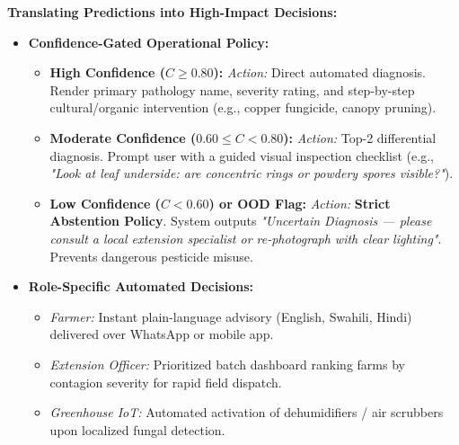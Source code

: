 \documentclass[8pt]{article}
\begin{document}
\vspace{2mm}%

\noindent%
\begin{minipage}[t]{0.327\linewidth}%
  \begin{tcolorbox}[
    canvasbox,
    colback=bgDecision,
    colframe=headDecision,
    title={7. DECISIONS \& OPERATIONAL ACTIONS},
    boxed title style={colback=headDecision},
    height=68mm
  ]
  \fontsize{7.2pt}{8.8pt}\selectfont
  \textbf{Translating Predictions into High-Impact Decisions:}
  \vspace{1mm}
  \begin{itemize}
    \item \textbf{Confidence-Gated Operational Policy:}
      \begin{itemize}
        \item \textbf{High Confidence ($C \ge 0.80$):}
          \emph{Action:} Direct automated diagnosis. Render primary pathology name, severity rating, and step-by-step cultural/organic intervention (e.g., copper fungicide, canopy pruning).
        \item \textbf{Moderate Confidence ($0.60 \le C < 0.80$):}
          \emph{Action:} Top-2 differential diagnosis. Prompt user with a guided visual inspection checklist (e.g., \emph{"Look at leaf underside: are concentric rings or powdery spores visible?"}).
        \item \textbf{Low Confidence ($C < 0.60$) or OOD Flag:}
          \emph{Action:} \textbf{Strict Abstention Policy}. System outputs \emph{"Uncertain Diagnosis --- please consult a local extension specialist or re-photograph with clear lighting"}. Prevents dangerous pesticide misuse.
      \end{itemize}
    \item \textbf{Role-Specific Automated Decisions:}
      \begin{itemize}
        \item \emph{Farmer:} Instant plain-language advisory (English, Swahili, Hindi) delivered over WhatsApp or mobile app.
        \item \emph{Extension Officer:} Prioritized batch dashboard ranking farms by contagion severity for rapid field dispatch.
        \item \emph{Greenhouse IoT:} Automated activation of dehumidifiers / air scrubbers upon localized fungal detection.
      \end{itemize}
  \end{itemize}
  \end{tcolorbox}%
\end{minipage}\hfill%
\end{document}
